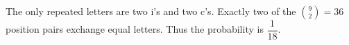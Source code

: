 The only repeated letters are two i's and two c's. Exactly two of the $\binom92=36$ position pairs exchange equal letters. Thus the probability is $\boxed{\dfrac{1}{18}}$.
